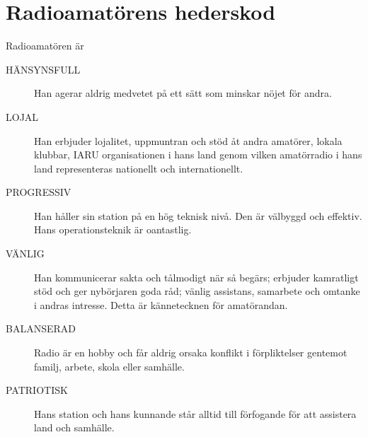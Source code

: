 \section[Hederskod]{Radioamatörens hederskod}

Radioamatören är

\begin{description}
  \item[HÄNSYNSFULL] Han agerar aldrig medvetet på ett sätt som minskar nöjet för andra.

  \item[LOJAL] Han erbjuder lojalitet, uppmuntran och stöd åt andra amatörer, lokala klubbar,
    IARU organisationen i hans land genom vilken amatörradio i hans land
    representeras nationellt och internationellt.

  \item[PROGRESSIV] Han håller sin station på en hög teknisk nivå. Den är välbyggd och effektiv.
    Hans operationsteknik är oantastlig.

  \item[VÄNLIG] Han kommunicerar sakta och tålmodigt när så begärs; erbjuder kamratligt stöd och ger nybörjaren goda råd; vänlig assistans, samarbete och omtanke i andras intresse. Detta är kännetecknen för amatörandan.

  \item[BALANSERAD] Radio är en hobby och får aldrig orsaka konflikt i förpliktelser gentemot
    familj, arbete, skola eller samhälle.

  \item[PATRIOTISK] Hans station och hans kunnande står alltid till förfogande för att
    assistera land och samhälle.
\end{description}

  
  
  
